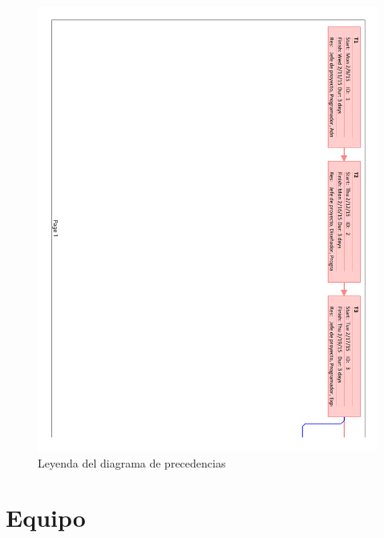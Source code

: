 \begin{figure}[!htbp]
	\centering
	\includegraphics[page=4, scale=.65]{fig/network_diagram}
	\caption{Leyenda del diagrama de precedencias}
\end{figure}

\FloatBarrier

\section{Equipo}

